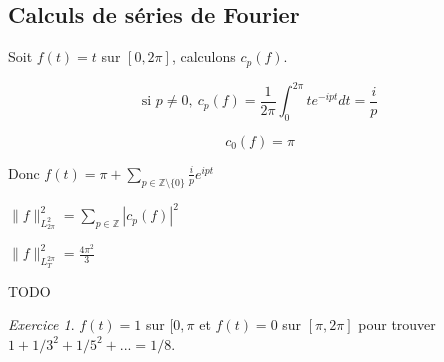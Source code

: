 \documentclass[]{article}
\theoremstyle{remark}
\newtheorem{myexer}{Exercice}
\theoremstyle{definition}
\begin{document}
\subsection{Calculs de séries de Fourier}

Soit $f(t) = t$ sur $[0, 2\pi]$, calculons $c_p(f)$.

$$\text{si } p \neq 0, ~ c_p(f) = \frac{1}{2 \pi} \int_{0}^{2 \pi}t e^{- i p t}dt = \frac{i}{p}$$

$$c_0(f) = \pi$$

Donc $\displaystyle f(t) = \pi + \sum_{p \in \mathbb{Z} \setminus \{0\}} \frac{i}{p} e^{i p t}$

$\|f\|^2_{L_{2 \pi}^2} = \sum_{p \in \mathbb{Z}} |c_p(f)|^2$

$\|f\|^2_{L^{2\pi}_T} = \frac{4\pi^2}{3}$

TODO

\begin{myexer}
	$f(t) = 1$ sur $[0, \pi$ et $f(t) = 0$ sur $[\pi, 2\pi]$ pour trouver $1 + 1/3^2 + 1/5^2 +... = 1/8$.
\end{myexer}
\end{document}
